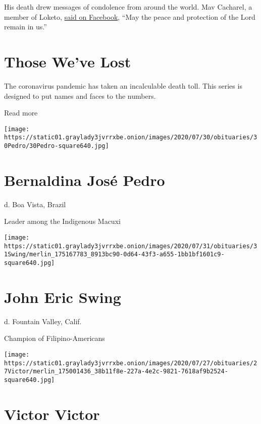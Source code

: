 His death drew messages of condolence from around the world. Mav
Cacharel, a member of Loketo,
\href{https://www.facebookcorewwwi.onion/mavcacharel.fr/posts/3200452843298452?_rdc=1\&_rdr}{said
on Facebook}, ``May the peace and protection of the Lord remain in us.''

\href{https://www.nytimes3xbfgragh.onion/interactive/2020/obituaries/people-died-coronavirus-obituaries.html?action=click\&pgtype=Article\&state=default\&region=BELOW_MAIN_CONTENT\&context=covid_obits_promo}{}

\hypertarget{those-weve-lost}{%
\section{Those We've Lost}\label{those-weve-lost}}

The coronavirus pandemic has taken an incalculable death toll. This
series is designed to put names and faces to the numbers.

Read more

\texttt{[image: https://static01.graylady3jvrrxbe.onion/images/2020/07/30/obituaries/30Pedro/30Pedro-square640.jpg]}

\hypertarget{bernaldina-josuxe9-pedro}{%
\section{Bernaldina José Pedro}\label{bernaldina-josuxe9-pedro}}

d. Boa Vista, Brazil

Leader among the Indigenous Macuxi

\texttt{[image: https://static01.graylady3jvrrxbe.onion/images/2020/07/31/obituaries/31Swing/merlin\_175167783\_8913bc90-0d64-43f3-a655-1bb1bf1601c9-square640.jpg]}

\hypertarget{john-eric-swing}{%
\section{John Eric Swing}\label{john-eric-swing}}

d. Fountain Valley, Calif.

Champion of Filipino-Americans

\texttt{[image: https://static01.graylady3jvrrxbe.onion/images/2020/07/27/obituaries/27Victor/merlin\_175001436\_38b11f8e-227a-4e2c-9821-7618af9b2524-square640.jpg]}

\hypertarget{victor-victor}{%
\section{Victor Victor}\label{victor-victor}}

